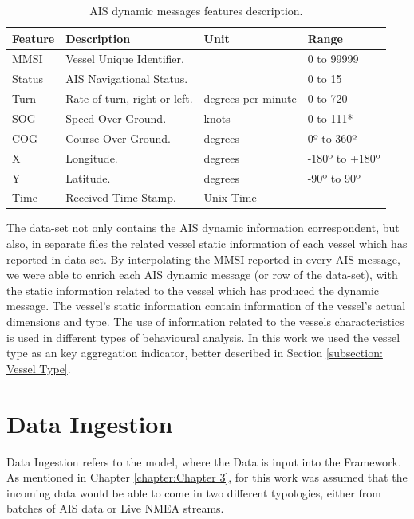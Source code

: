 \begin{table}[H]
\centering
\caption{AIS dynamic messages features description.}
\label{Table: Data-Set Features}
\begin{tabular}{@{}llll@{}}
\toprule
Feature & Description                  & Unit               & Range          \\ \midrule
MMSI    & Vessel Unique Identifier.     &                    & 0 to 99999     \\
Status  & AIS Navigational Status.     &                    & 0 to 15        \\
Turn    & Rate of turn, right or left. & degrees per minute & 0 to 720       \\
SOG     & Speed Over Ground.           & knots              & 0 to 111*      \\
COG     & Course Over Ground.          & degrees            & 0º to 360º     \\
X       & Longitude.                   & degrees            & -180º to +180º \\
Y       & Latitude.                    & degrees            & -90º to 90º    \\
Time    & Received Time-Stamp.         & Unix Time          &                \\ \bottomrule
\end{tabular}
\end{table}

The data-set not only contains the AIS dynamic information correspondent, but also, in separate files the related vessel static information of each vessel which has reported in data-set. By interpolating the MMSI reported in every AIS message, we were able to enrich each AIS dynamic message (or row of the data-set), with the static information related to the vessel which has produced the dynamic message. The vessel's static information contain information of the vessel's actual dimensions and type. The use of information related to the vessels characteristics is used in different types of behavioural analysis. In this work we used the vessel type as an key aggregation indicator, better described in Section \ref{subsection: Vessel Type}.

\section{Data Ingestion}
Data Ingestion refers to the model, where the Data is input into the Framework. As mentioned in Chapter \ref{chapter:Chapter 3}, for this work was assumed that the incoming data would be able to come in two different typologies, either from batches of AIS data or Live NMEA streams. 


